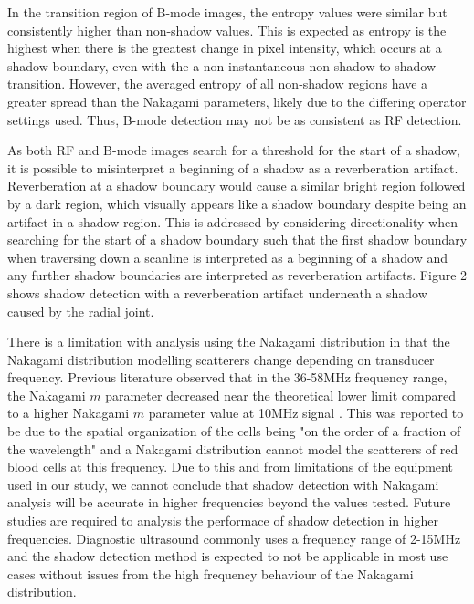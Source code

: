 \documentclass[authoryear,preprint,review,12pt]{elsarticle}
\begin{document}
In the transition region of B-mode images, the entropy values were similar but consistently higher than non-shadow values. This is expected as entropy is the highest when there is the greatest change in pixel intensity, which occurs at a shadow boundary, even with the a non-instantaneous non-shadow to shadow transition. However, the averaged entropy of all non-shadow regions have a greater spread than the Nakagami parameters, likely due to the differing operator settings used. Thus, B-mode detection may not be as consistent as RF detection.

As both RF and B-mode images search for a threshold for the start of a shadow, it is possible to misinterpret a beginning of a shadow as a reverberation artifact. Reverberation at a shadow boundary would cause a similar bright region followed by a dark region, which visually appears like a shadow boundary despite being an artifact in a shadow region. This is addressed by considering directionality when searching for the start of a shadow boundary such that the first shadow boundary when traversing down a scanline is interpreted as a beginning of a shadow and any further shadow boundaries are interpreted as reverberation artifacts. Figure 2 shows shadow detection with a reverberation artifact underneath a shadow caused by the radial joint.

There is a limitation with analysis using the Nakagami distribution in that the Nakagami distribution modelling scatterers change depending on transducer frequency. Previous literature observed that in the 36-58MHz frequency range, the Nakagami $m$ parameter decreased near the theoretical lower limit compared to a higher Nakagami $m$ parameter value at 10MHz signal \citep{Cloutier2004}. This was reported to be due to the spatial organization of the cells being "on the order of a fraction of the wavelength" and a Nakagami distribution cannot model the scatterers of red blood cells at this frequency. Due to this and from limitations of the equipment used in our study, we cannot conclude that shadow detection with Nakagami analysis will be accurate in higher frequencies beyond the values tested. Future studies are required to analysis the performace of shadow detection in higher frequencies. Diagnostic ultrasound commonly uses a frequency range of 2-15MHz \citep{Jensen2007} and the shadow detection method is expected to not be applicable in most use cases without issues from the high frequency behaviour of the Nakagami distribution.
\end{document}
